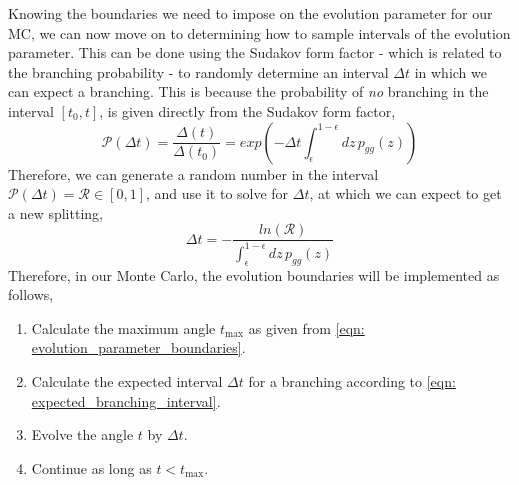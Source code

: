 \documentclass[main.tex]{subfiles}
\begin{document}
Knowing the boundaries we need to impose on the evolution parameter for our MC, we can now move on to determining how to sample intervals of the evolution parameter.
This can be done using the Sudakov form factor - which is related to the branching probability - to randomly determine an interval \(\Delta t\) in which we can expect a branching. This is because the probability of \textit{no} branching in the interval \([t_0, t]\), is given directly from the Sudakov form factor,
\begin{equation}\label{eqn: branching_probability_from_sudakov}
    \mathcal{P}(\Delta t) = \frac{\Delta(t)}{\Delta(t_0)} = exp\left(-\Delta t \int_\epsilon^{1-\epsilon}dz \, p_{gg}(z)\right) 
\end{equation}
Therefore, we can generate a random number in the interval \(\mathcal{P}(\Delta t) = \mathcal{R} \in [0,1]\), and use it to solve for \(\Delta t\), at which we can expect to get a new splitting, 
\begin{equation}\label{eqn: expected_branching_interval}
    \Delta t = -\frac{ln(\mathcal{R})}{ \int_\epsilon^{1-\epsilon}dz \, p_{gg}(z)} 
\end{equation}
Therefore, in our Monte Carlo, the evolution boundaries will be implemented as follows, 
\begin{enumerate}
    \item Calculate the maximum angle \(t_{\text{max}}\) as given from \autoref{eqn: evolution_parameter_boundaries}.
    \item Calculate the expected interval \(\Delta t\) for a branching according to \autoref{eqn: expected_branching_interval}.
    \item Evolve the angle \(t\) by \(\Delta t\).
    \item Continue as long as \(t< t_{\text{max}}\). 
\end{enumerate}
\end{document}
